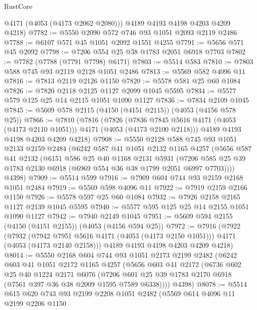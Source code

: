 \begin{lexlean}{RustCore}
\begin{coremodule}
        @4171
        (@4053 (@4173 @2062 @2080)))
      @4189
      @4193
      @4198
      @4203
      @4209
      @4218)
@7782 := @5550 @2090 @572 @746 @93 @1051 @2093 @2119 @2486
@7788 := @6107 @571 @45 @1051 @2092 @1551 @4255
@7791 := @5656 @571 @45 @2092
@7798 := @7206 @554 @25 @38 @1783 @2051 @6918 @7703
@7802 := @7782 (@7788 (@7791 @7798) @6171)
@7803 := @5514 @583
@7810 := @7803 @588 @745 @93 @2119 @2128 @1051 @2486
@7813 := @5569 @582 @4096 @11
@7816 := @7813 @2119 @2126 @1150
@7820 := @5578 @581 @25 @60 @1084
@7826 := @7820 @2118 @2125 @1127 @2099 @1045 @5595
@7834 := @5577 @579 @125 @25 @14 @2115 @1051 @1090 @1127
@7836 := @7834 @2109 @1045
@7845 := @5609 @578 @2115 (@4150 (@4151 @2115)) (@4053 (@4156 @578 @25))
@7866 := @7810
    (@7816
      (@7826
        (@7836 @7845 @5616 @4171 (@4053 (@4173 @2110 @1051)))
        @4171
        (@4053 (@4173 @2100 @2118)))
      @4189
      @4193
      @4198
      @4203
      @4209
      @4218)
@7908 := @5550
    @2128
    @588
    @745
    @93
    @1051
    @2133
    @2159
    @2484
    (@6242
      @587
      @41
      @1051
      @2132
      @1165
      @4257
      (@5656
        @587
        @41
        @2132
        (@6151
          @586
          @25
          @40
          @1168
          @2131
          @5931
          (@7206 @585 @25 @39 @1783 @2130 @6918 (@6969 @554 @36 @38 @1799 @2051 @6997 @7703))))
      @4398)
@7909 := @5514 @599
@7916 := @7909 @604 @744 @93 @2159 @2168 @1051 @2484
@7919 := @5569 @598 @4096 @11
@7922 := @7919 @2159 @2166 @1150
@7926 := @5578 @597 @25 @60 @1084
@7932 := @7926 @2158 @2165 @1127 @2139 @1045 @5595
@7940 := @5577 @595 @125 @25 @14 @2155 @1051 @1090 @1127
@7942 := @7940 @2149 @1045
@7951 := @5609 @594 @2155 (@4150 (@4151 @2155)) (@4053 (@4156 @594 @25))
@7972 := @7916
    (@7922
      (@7932
        (@7942 @7951 @5616 @4171 (@4053 (@4173 @2150 @1051)))
        @4171
        (@4053 (@4173 @2140 @2158)))
      @4189
      @4193
      @4198
      @4203
      @4209
      @4218)
@8014 := @5550
    @2168
    @604
    @744
    @93
    @1051
    @2173
    @2199
    @2482
    (@6242
      @603
      @41
      @1051
      @2172
      @1165
      @4257
      (@5656
        @603
        @41
        @2172
        (@6736
          @602
          @25
          @40
          @1224
          @2171
          @6076
          (@7206 @601 @25 @39 @1783 @2170 @6918 (@7561 @397 @36 @38 @2009 @1595 @7589 @6338))))
      @4398)
@8078 := @5514
    @615
    @620
    @743
    @93
    @2199
    @2208
    @1051
    @2482
    (@5569
      @614
      @4096
      @11
      @2199
      @2206
      @1150

\end{coremodule}
\end{lexlean}
